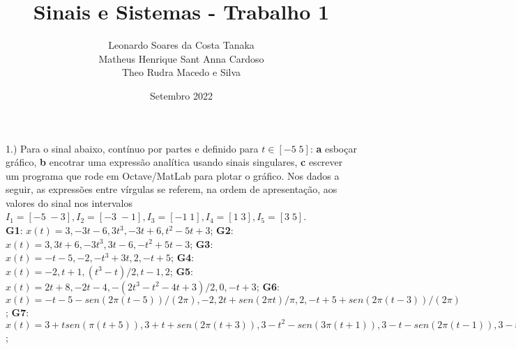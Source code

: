 \documentclass{article}
\title{Sinais e Sistemas - Trabalho 1}
\author{
    Leonardo Soares da Costa Tanaka \\
    Matheus Henrique Sant Anna Cardoso \\
    Theo Rudra Macedo e Silva
}
\date{Setembro 2022}
\begin{document}
\maketitle

1.) Para o sinal abaixo, contínuo por partes e definido para $t \in [-5\;5]$: \textbf{a} esboçar gráfico, \textbf{b} encotrar uma expressão analítica usando sinais singulares, \textbf{c} escrever um programa que rode em Octave/MatLab para plotar o gráfico. Nos dados a seguir, as expressões entre vírgulas se referem, na ordem de apresentação, aos valores do sinal nos intervalos $I_{1} = [-5\;-3], I_{2} = [-3\;-1], I_{3} = [-1\;1], I_{4} = [1\;3], I_{5} = [3\;5]$.\\
\textbf{G1}: $x(t) = 3, -3t - 6, 3t^3, -3t + 6, t^2 -5t + 3$;\;
\textbf{G2}: $x(t) = 3, 3t + 6, -3t^3, 3t - 6, -t^2 + 5t - 3$;\;
\textbf{G3}: $x(t) = -t -5, -2, -t^3 + 3t, 2, -t + 5$;\;
\textbf{G4}: $x(t) = -2, t + 1, (t^3 - t) / 2, t - 1, 2$;\;
\textbf{G5}: $x(t) = 2t + 8, -2t - 4, -(2t^3 - t^2 - 4t + 3) / 2,0, -t + 3$;\;
\textbf{G6}: $x(t) = -t-5- sen(2\pi (t - 5))/(2\pi),-2,2t + sen(2\pi t)/\pi,2, -t + 5 + sen(2\pi (t - 3)) / (2 \pi )$;\;
\textbf{G7}: $x(t) = 3 + t sen(\pi (t + 5)),3 + t + sen(2\pi (t + 3)), 3 - t^2 - sen(3\pi (t + 1)), 3 - t - sen(2\pi (t - 1)),3 - t - sen(\pi (t - 3))$;\;
\end{document}
